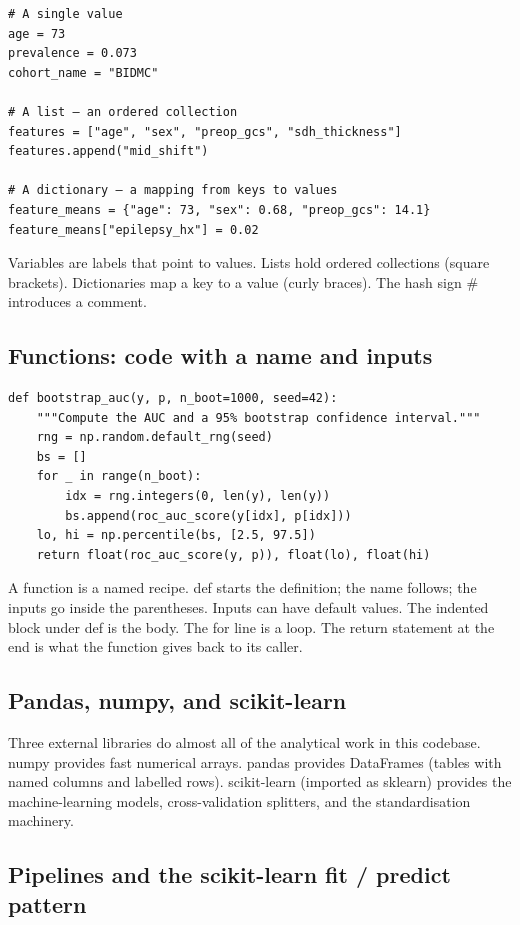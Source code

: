 \documentclass[11pt,a4paper]{article}
\begin{document}
\begin{lstlisting}[style=codeblock]
# A single value
age = 73
prevalence = 0.073
cohort_name = "BIDMC"

# A list — an ordered collection
features = ["age", "sex", "preop_gcs", "sdh_thickness"]
features.append("mid_shift")

# A dictionary — a mapping from keys to values
feature_means = {"age": 73, "sex": 0.68, "preop_gcs": 14.1}
feature_means["epilepsy_hx"] = 0.02
\end{lstlisting}

Variables are labels that point to values. Lists hold ordered collections (square brackets). Dictionaries map a key to a value (curly braces). The hash sign \# introduces a comment.
\subsection{Functions: code with a name and inputs}

\begin{lstlisting}[style=codeblock]
def bootstrap_auc(y, p, n_boot=1000, seed=42):
    """Compute the AUC and a 95% bootstrap confidence interval."""
    rng = np.random.default_rng(seed)
    bs = []
    for _ in range(n_boot):
        idx = rng.integers(0, len(y), len(y))
        bs.append(roc_auc_score(y[idx], p[idx]))
    lo, hi = np.percentile(bs, [2.5, 97.5])
    return float(roc_auc_score(y, p)), float(lo), float(hi)
\end{lstlisting}

A function is a named recipe. def starts the definition; the name follows; the inputs go inside the parentheses. Inputs can have default values. The indented block under def is the body. The for line is a loop. The return statement at the end is what the function gives back to its caller.
\subsection{Pandas, numpy, and scikit-learn}
Three external libraries do almost all of the analytical work in this codebase. numpy provides fast numerical arrays. pandas provides DataFrames (tables with named columns and labelled rows). scikit-learn (imported as sklearn) provides the machine-learning models, cross-validation splitters, and the standardisation machinery.
\subsection{Pipelines and the scikit-learn fit / predict pattern}
\end{document}
